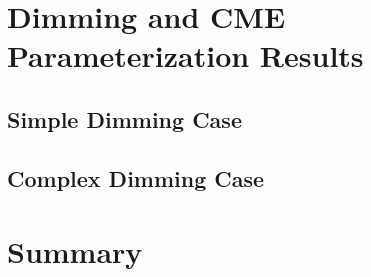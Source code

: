 \section{Dimming and CME Parameterization Results}
\label{sec:casestudyresults}

\subsection{Simple Dimming Case}

\subsection{Complex Dimming Case}

\section{Summary}














